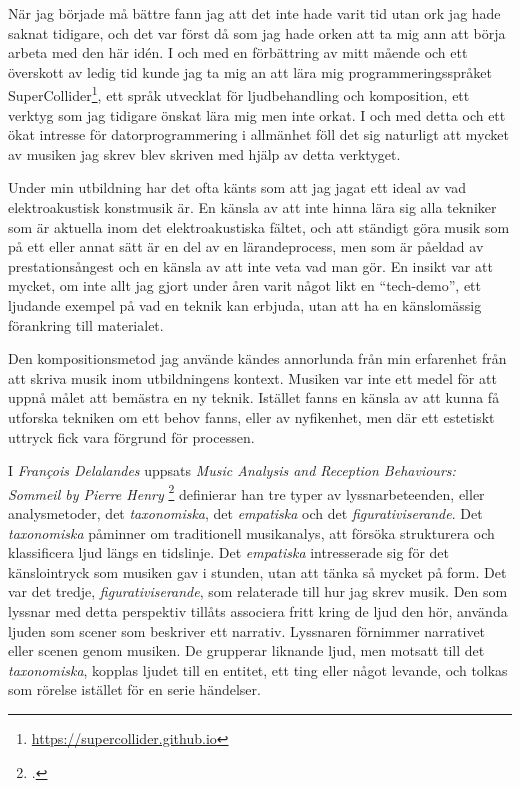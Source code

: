 \documentclass{article}
\begin{document}
När jag började må bättre fann jag att det inte hade varit tid utan ork jag hade saknat tidigare, och det var
först då som jag hade orken att ta mig ann att börja arbeta med den här idén. I och med en förbättring av
mitt mående och ett överskott av ledig tid kunde jag ta mig an att lära mig programmeringsspråket 
SuperCollider\footnote{\url{https://supercollider.github.io}}, ett språk utvecklat för ljudbehandling och
komposition, ett verktyg som jag tidigare önskat lära mig men inte orkat. I och med detta och ett ökat
intresse för datorprogrammering i allmänhet föll det sig naturligt att mycket av musiken jag skrev blev
skriven med hjälp av detta verktyget.

Under min utbildning har det ofta känts som att jag jagat ett ideal av vad elektroakustisk konstmusik är. En
känsla av att inte hinna lära sig alla tekniker som är aktuella inom det elektroakustiska fältet, och att
ständigt göra musik som på ett eller annat sätt är en del av en lärandeprocess, men som är påeldad av
prestationsångest och en känsla av att inte veta vad man gör. En insikt var att mycket, om inte allt jag gjort
under åren varit något likt en ``tech-demo'', ett ljudande exempel på vad en teknik kan erbjuda, utan att ha
en känslomässig förankring till materialet.

Den kompositionsmetod jag använde kändes annorlunda från min erfarenhet från att skriva musik inom
utbildningens kontext. Musiken var inte ett medel för att uppnå målet att bemästra en ny teknik. Istället
fanns en känsla av att kunna få utforska tekniken om ett behov fanns, eller av nyfikenhet, men där ett
estetiskt uttryck fick vara förgrund för processen. 

I \emph{François Delalandes} uppsats \emph{Music Analysis and Reception Behaviours: Sommeil by Pierre Henry}
\footcite[26, 38, 52]{Delalande1998} definierar han tre typer av lyssnarbeteenden, eller analysmetoder, det
\emph{taxonomiska}, det \emph{empatiska} och det \emph{figurativiserande}. Det \emph{taxonomiska} påminner om
traditionell musikanalys, att försöka strukturera och klassificera ljud längs en tidslinje. Det
\emph{empatiska} intresserade sig för det känslointryck som musiken gav i stunden, utan att tänka så mycket på
form. Det var det tredje, \emph{figurativiserande}, som relaterade till hur jag skrev musik. Den som lyssnar
med detta perspektiv tillåts associera fritt kring de ljud den hör, använda ljuden som scener som beskriver
ett narrativ. Lyssnaren förnimmer narrativet eller scenen genom musiken. De grupperar liknande ljud,
men motsatt till det \emph{taxonomiska}, kopplas ljudet till en entitet, ett ting eller något levande, och
tolkas som rörelse istället för en serie händelser.
\end{document}
